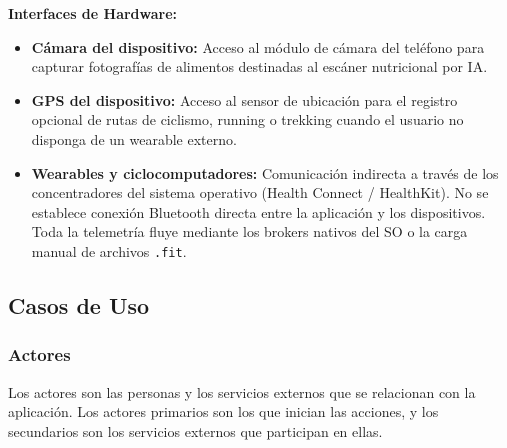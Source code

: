 \textbf{Interfaces de Hardware:}
\begin{itemize}
    \item \textbf{Cámara del dispositivo:} Acceso al módulo de cámara del teléfono para capturar fotografías de alimentos destinadas al escáner nutricional por IA.
    \item \textbf{GPS del dispositivo:} Acceso al sensor de ubicación para el registro opcional de rutas de ciclismo, running o trekking cuando el usuario no disponga de un wearable externo.
    \item \textbf{Wearables y ciclocomputadores:} Comunicación indirecta a través de los concentradores del sistema operativo (Health Connect / HealthKit). No se establece conexión Bluetooth directa entre la aplicación y los dispositivos. Toda la telemetría fluye mediante los brokers nativos del SO o la carga manual de archivos \texttt{.fit}.
\end{itemize}
\newpage
\subsection{Casos de Uso}
\subsubsection{Actores}
Los actores son las personas y los servicios externos que se relacionan con la aplicación. Los actores primarios son los que inician las acciones, y los secundarios son los servicios externos que participan en ellas.

